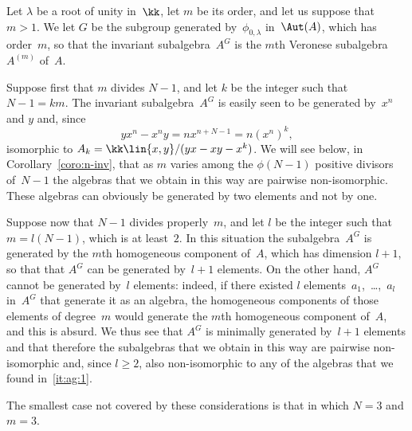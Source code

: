 Let $\lambda$ be a root of unity in~$\kk$, let $m$ be its order, and let us
suppose that $m>1$. We let $G$ be the subgroup generated
by~$\phi_{0,\lambda}$ in~$\Aut(A)$, which has order~$m$, so that the
invariant subalgebra~$A^G$ is the $m$th Veronese
subalgebra~$A^{(m)}$ of~$A$. 
\begin{thmlist}

\item\label{it:ag:1} Suppose first that $m$ divides $N-1$, and let $k$ be
the integer such that $N-1=km$. The invariant subalgebra~$A^G$ is easily
seen to be generated by~$x^n$ and $y$ and, since
  \[
  yx^n-x^ny=nx^{n+N-1}=n(x^n)^k,
  \]
isomorphic to $A_k=\kk\lin{x,y}/(yx-xy-x^k)$. We will see below, in
Corollary~\ref{coro:n-inv}, that as $m$ varies among the $\phi(N-1)$
positive divisors of~$N-1$ the algebras that we obtain in this way are
pairwise non-isomorphic. These algebras can obviously be generated by two
elements and not by one.

\item Suppose now that $N-1$ divides properly~$m$, and let $l$ be the
integer such that $m=l(N-1)$, which is at least~$2$. In this situation the
subalgebra~$A^G$ is generated by the $m$th homo\-geneous component of~$A$,
which has dimension $l+1$, so that that $A^G$ can be generated by~$l+1$
elements. On the other hand, $A^G$ cannot be generated by~$l$ elements:
indeed, if there existed $l$ elements~$a_1$,~\dots,~$a_l$ in~$A^G$ that
generate it as an algebra, the homogeneous components of those elements of
degree~$m$ would generate the $m$th homo\-geneous component of~$A$, and
this is absurd. We thus see that $A^G$ is minimally generated by~$l+1$
elements and that therefore the subalgebras that we obtain in this way are
pairwise non-isomorphic and, since $l\geq2$, also non-isomorphic to any of
the algebras that we found in~\ref{it:ag:1}.

\end{thmlist}
The smallest case not covered by these considerations is that in which
$N=3$ and $m=3$.
